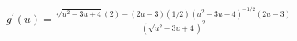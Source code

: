 $ \displaystyle g^{\prime}(u) = \frac{\sqrt{ u^2 - 3u + 4 } (2) - (2u - 3) (1/2) (u^2-3u+4)^{-1/2}(2u-3)}{ (\sqrt{ u^2 - 3u + 4 })^2 } $